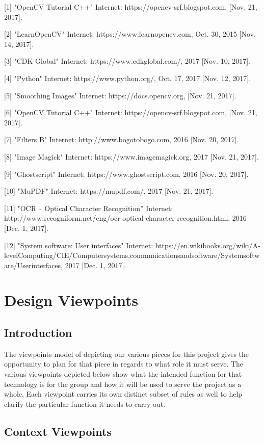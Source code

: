 \documentclass[onecolumn, draftclsnofoot,10pt, compsoc]{IEEEtran}
\begin{document}
[1] "OpenCV Tutorial C++" Internet: https://opencv-srf.blogspot.com, [Nov. 21, 2017].

[2] "LearnOpenCV" Internet: https://www.learnopencv.com, Oct. 30, 2015 [Nov. 14, 2017].

[3] "CDK Global" Internet: https://www.cdkglobal.com/, 2017 [Nov. 10, 2017].

[4] "Python" Internet: https://www.python.org/, Oct. 17, 2017 [Nov. 12, 2017].

[5] "Smoothing Images" Internet: https://docs.opencv.org, [Nov. 21, 2017].

[6] "OpenCV Tutorial C++" Internet: https://opencv-srf.blogspot.com, [Nov. 21, 2017].

[7] "Filters B" Internet: http://www.bogotobogo.com, 2016 [Nov. 20, 2017].

[8] "Image Magick" Internet: https://www.imagemagick.org, 2017 [Nov. 21, 2017].

[9] "Ghostscript" Internet: https://www.ghostscript.com, 2016 [Nov. 20, 2017].

[10] "MuPDF" Internet: https://mupdf.com/, 2017 [Nov. 21, 2017].

[11] "OCR – Optical Character Recognition” Internet: http://www.recogniform.net/eng/ocr-optical-character-recognition.html, 2016 [Dec. 1, 2017].

[12] "System software: User interfaces" Internet: https://en.wikibooks.org/wiki/A-levelComputing/CIE/Computersystems,communicationsandsoftware/Systemsoftware/Userinterfaces, 2017 [Dec. 1, 2017].

\section{Design Viewpoints}
\subsection{Introduction}
The viewpoints model of depicting our various pieces for this project gives the opportunity to plan for that piece in regards to what role it must serve. The various viewpoints depicted below show what the intended function for that technology is for the group and how it will be used to serve the project as a whole. Each viewpoint carries its own distinct subset of rules as well to help clarify the particular function it needs to carry out. 

\subsection{Context Viewpoints}
\end{document}
